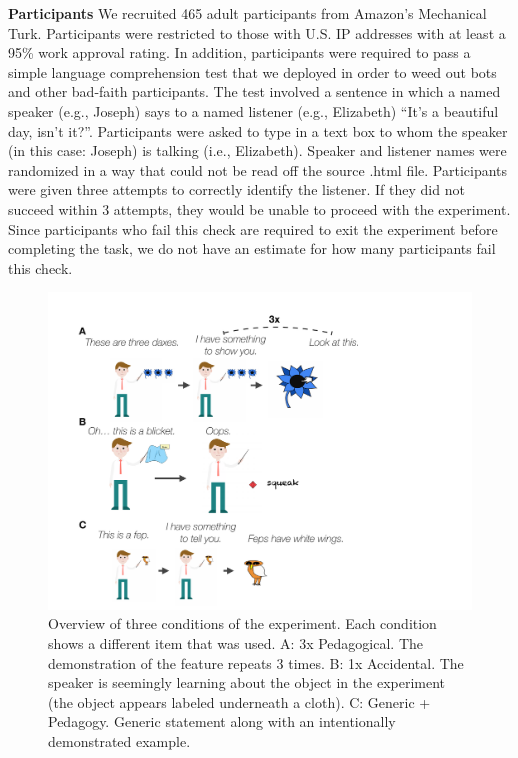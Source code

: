 \documentclass[10pt,letterpaper]{article}
\begin{document}
\noindent\textbf{Participants}
We recruited 465 adult participants from Amazon's Mechanical Turk. 
Participants were restricted to those with U.S. IP addresses with at least a 95\% work approval rating. 
In addition, participants were required to pass a simple language comprehension test that we deployed in order to weed out bots and other bad-faith participants. 
The test involved a sentence in which a named speaker (e.g., Joseph) says to a named listener (e.g., Elizabeth) ``It's a beautiful day, isn't it?''. 
Participants were asked to type in a text box to whom the speaker (in this case: Joseph) is talking (i.e., Elizabeth).
Speaker and listener names were randomized in a way that could not be read off the source .html file.
Participants were given three attempts to correctly identify the listener. 
If they did not succeed within 3 attempts, they would be unable to proceed with the experiment.
Since participants who fail this check are required to exit the experiment before completing the task, we do not have an estimate for how many participants fail this check. 

\begin{figure}[t]
\begin{center}
\includegraphics[width=\linewidth]{figs/expt-cartoon.pdf}
\end{center}
\caption{Overview of three conditions of the experiment. Each condition shows a different item that was used. A: 3x Pedagogical. The demonstration of the feature repeats 3 times. B: 1x Accidental. The speaker is seemingly learning about the object in the experiment (the object appears labeled underneath a cloth). C: Generic + Pedagogy. Generic statement along with an intentionally demonstrated example.}
\label{fig:expt}
\end{figure}
\end{document}
